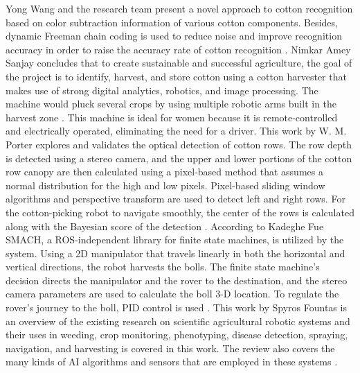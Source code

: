 \documentclass[12pt,a4paper]{report}
\begin{document}
\par Yong Wang and the research team present a novel approach to cotton recognition based on color subtraction information of various cotton components. Besides, dynamic Freeman chain coding is used to reduce noise and improve recognition accuracy in order to raise the accuracy rate of cotton recognition \cite{r11}. Nimkar Amey Sanjay concludes that to create sustainable and successful agriculture, the goal of the project is to identify, harvest, and store cotton using a cotton harvester that makes use of strong digital analytics, robotics, and image processing. The machine would pluck several crops by using multiple robotic arms built in the harvest zone \cite{r12}. This machine is ideal for women because it is remote-controlled and electrically operated, eliminating the need for a driver. This work by W. M. Porter explores and validates the optical detection of cotton rows. The row depth is detected using a stereo camera, and the upper and lower portions of the cotton row canopy are then calculated using a pixel-based method that assumes a normal distribution for the high and low pixels. Pixel-based sliding window algorithms and perspective transform are used to detect left and right rows. For the cotton-picking robot to navigate smoothly, the center of the rows is calculated along with the Bayesian score of the detection \cite{r13}. According to Kadeghe Fue SMACH, a ROS-independent library for finite state machines, is utilized by the system. Using a 2D manipulator that travels linearly in both the horizontal and vertical directions, the robot harvests the bolls. The finite state machine's decision directs the manipulator and the rover to the destination, and the stereo camera parameters are used to calculate the boll 3-D location. To regulate the rover's journey to the boll, PID control is used \cite{r14}. This work by Spyros Fountas is an overview of the existing research on scientific agricultural robotic systems and their uses in weeding, crop monitoring, phenotyping, disease detection, spraying, navigation, and harvesting is covered in this work. The review also covers the many kinds of AI algorithms and sensors that are employed in these systems \cite{r15}. 
\end{document}
